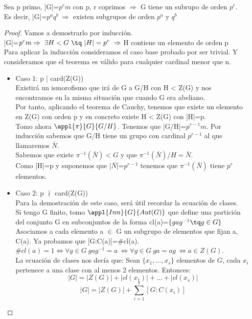 \documentclass{apuntes}
\begin{document}
\begin{theorem}
 Sea p primo, |G|=$p^{r}m$  con p, r coprimos $\Rightarrow$  G tiene un subrupo de orden $p^{r}$.\\
 Es decir, |G|=$p^{a}q^{b} \ \Rightarrow$  existen subgrupos de orden $p^{a}$  y $q^{b}$
\end{theorem}
\begin{proof}
 Vamos a demostrarlo por inducción.\\
 |G|=$p^{r}m \Rightarrow \ \exists H < G \ \tq \ |H|=p^{r} \ \Rightarrow$  H contiene un elemento de orden p\\
 
 Para aplicar la inducción consideramos el caso base probado por ser trivial. Y consideramos que el teorema es válido para cualquier cardinal
 menor que n.
 \begin{itemize}
  \item Caso 1: p | card(Z(G))\\
    Existirá un ismorofismo que irá de G a G/H con H < Z(G) y nos encontramos en la misma situación que cuando G era abeliano.\\
    Por tanto, aplicando el teorema de Cauchy, tenemos que existe un elemento en Z(G) con orden p y en concreto existe H < Z(G) con |H|=p.\\
    Tomo ahora $\appl{\pi}{G}{G/H}$. Tenemos que |G/H|=$p^{r-1}m$. Por inducción sabemos que G/H tiene un grupo con cardinal $p^{r-1}$  al que
    llamaremos $\bar{N}$.\\
    Sabemos que existe $\pi^{-1}(\bar{N}) < G$  y que $\pi^{-1}(\bar{N}) /H=\bar{N}$.\\
    Como |H|=p y suponemos que |$\bar{N}$|=$p^{r-1}$  tenemos que $\pi^{-1}(\bar{N})$  tiene $p^{r}$  elementos.
    
  \item Caso 2: p $\nmid$  card(Z(G))\\
  Para la demostración de este caso, será útil recordar la ecuación de clases.\\
  Si tengo G finito, tomo $\appl{Inn}{G}{Aut(G)}$  que define una partición del conjunto G en subconjuntos de la forma cl(a)=$\{gag^{-1} \tq g\in G\}$
  Asociamos a cada elemento a $\in$ G un subgrupo de elementos que fijan a, C(a). Ya probamos que [G:C(a)]=$\#$cl(a).\\
  $\#cl(a)=1 \Leftrightarrow \forall g\in G \ gag^{-1}=a \ \Leftrightarrow \forall g \in G \ ga=ag \ \Leftrightarrow a \in Z(G)$.\\
  La ecuación de clases nos decía que:
  Sean $\{ x_1, \hdots, x_s \}$ elementos de $G$, cada $x_i$ pertenece a una clase con al menos 2 elementos. Entonces: \\
  $$|G| = |Z(G)| + |cl(x_1)| + \hdots + |cl(x_s)|$$
  $$|G| = |Z(G)| + \sum_{i=1}^{s}[G:C(x_i)]$$
  

\end{itemize}
\end{proof}
\end{document}
